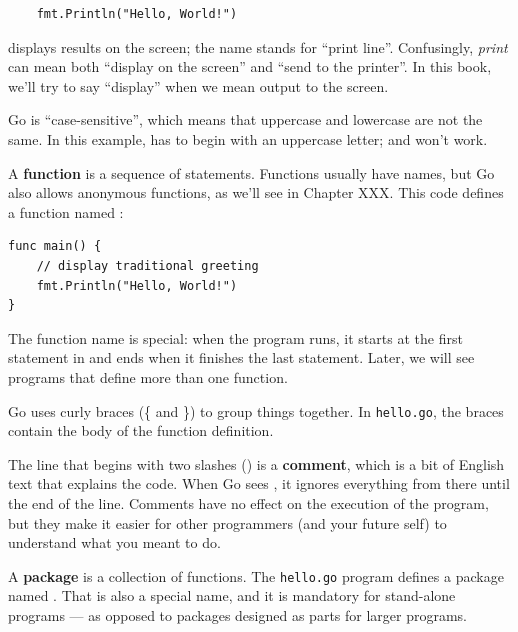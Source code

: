 \begin{lstlisting}
	fmt.Println("Hello, World!")
\end{lstlisting}


 displays results on the screen; the name  stands for ``print line''.
Confusingly, {\em print} can mean both ``display on the screen'' and ``send to the printer''.
In this book, we'll try to say ``display'' when we mean output to the screen.


Go is ``case-sensitive'', which means that uppercase and lowercase are not the same.
In this example,  has to begin with an uppercase letter;  and  won't work.


A {\bf function} is a sequence of statements.
Functions usually have names, but Go also allows anonymous functions, as we'll see in Chapter XXX.
This code defines a function named :

\begin{lstlisting}
func main() {
	// display traditional greeting
	fmt.Println("Hello, World!")
}
\end{lstlisting}


The function name  is special: when the program runs,
it starts at the first statement in  and ends when it finishes the last statement.
Later, we will see programs that define more than one function.


Go uses curly braces (\{ and \}) to group things together.
In {\tt hello.go}, the braces contain the body of the function definition.


The line that begins with two slashes (\java{//}) is a {\bf comment}, which is a bit of English text that explains the code.
When Go sees \java{//}, it ignores everything from there until the end of the line.
Comments have no effect on the execution of the program, but they make it easier for other programmers (and your future self) to understand what you meant to do.



A {\bf package} is a collection of functions.
The {\tt hello.go} program defines a package named . That is also a special name, and it is mandatory for stand-alone programs
--- as opposed to packages designed as parts for larger programs. 


